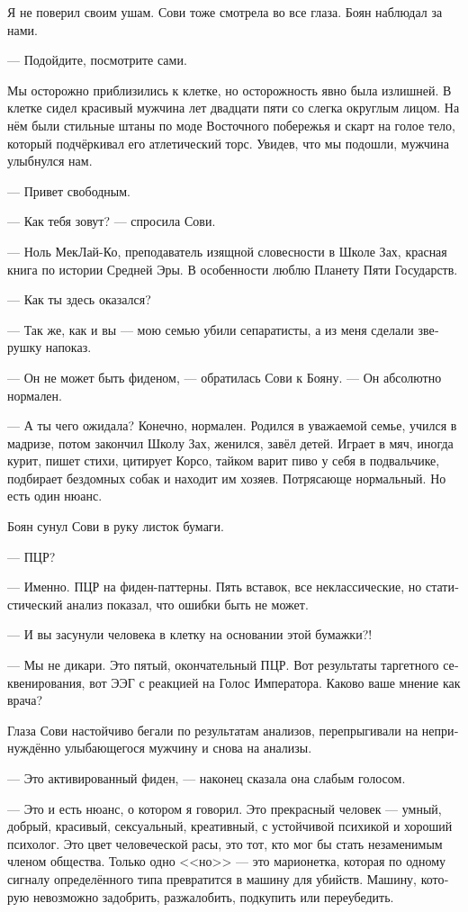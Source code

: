 \documentclass[a4paper,12pt,fleqn]{book}\usepackage{polyglossia}\setdefaultlanguage[babelshorthands=true]{russian}\setotherlanguage{english}\defaultfontfeatures{Ligatures=TeX,Mapping=tex-text}
\begin{document}
Я не поверил своим ушам.
Сови тоже смотрела во все глаза.
Боян наблюдал за нами.

--- Подойдите, посмотрите сами.

Мы осторожно приблизились к клетке, но осторожность явно была излишней.
В клетке сидел красивый мужчина лет двадцати пяти со слегка округлым лицом.
На нём были стильные штаны по моде Восточного побережья и скарт на голое тело, который подчёркивал его атлетический торс.
Увидев, что мы подошли, мужчина улыбнулся нам.

--- Привет свободным.

--- Как тебя зовут? --- спросила Сови.

--- Ноль МекЛай-Ко, преподаватель изящной словесности в Школе Зах, красная книга по истории Средней Эры.
В особенности люблю Планету Пяти Государств.

--- Как ты здесь оказался?

--- Так же, как и вы --- мою семью убили сепаратисты, а из меня сделали зверушку напоказ.

--- Он не может быть фиденом, --- обратилась Сови к Бояну.
--- Он абсолютно нормален.

--- А ты чего ожидала?
Конечно, нормален.
Родился в уважаемой семье, учился в мадризе, потом закончил Школу Зах, женился, завёл детей.
Играет в мяч, иногда курит, пишет стихи, цитирует Корсо, тайком варит пиво у себя в подвальчике, подбирает бездомных собак и находит им хозяев.
Потрясающе нормальный.
Но есть один нюанс.

Боян сунул Сови в руку листок бумаги.

--- ПЦР?

--- Именно.
ПЦР на фиден-паттерны.
Пять вставок, все неклассические, но статистический анализ показал, что ошибки быть не может.

--- И вы засунули человека в клетку на основании этой бумажки?!

--- Мы не дикари.
Это пятый, окончательный ПЦР.
Вот результаты таргетного секвенирования, вот ЭЭГ с реакцией на Голос Императора.
Каково ваше мнение как врача?

Глаза Сови настойчиво бегали по результатам анализов, перепрыгивали на непринуждённо улыбающегося мужчину и снова на анализы.

--- Это активированный фиден, --- наконец сказала она слабым голосом.

--- Это и есть нюанс, о котором я говорил.
Это прекрасный человек --- умный, добрый, красивый, сексуальный, креативный, с устойчивой психикой и хороший психолог.
Это цвет человеческой расы, это тот, кто мог бы стать незаменимым членом общества.
Только одно <<но>> --- это марионетка, которая по одному сигналу определённого типа превратится в машину для убийств.
Машину, которую невозможно задобрить, разжалобить, подкупить или переубедить.
\end{document}
